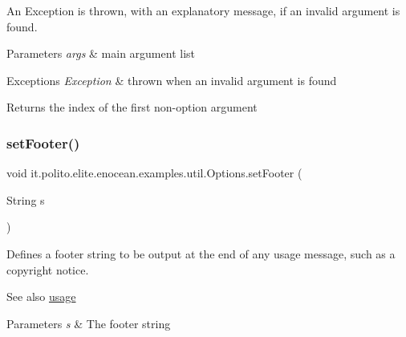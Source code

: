 An Exception is thrown, with an explanatory message, if an invalid argument is found. 
\begin{DoxyParams}{Parameters}
{\em args} & main argument list \\
\hline
\end{DoxyParams}

\begin{DoxyExceptions}{Exceptions}
{\em Exception} & thrown when an invalid argument is found \\
\hline
\end{DoxyExceptions}
\begin{DoxyReturn}{Returns}
the index of the first non-\/option argument 
\end{DoxyReturn}
\hypertarget{classit_1_1polito_1_1elite_1_1enocean_1_1examples_1_1util_1_1_options_a9b1cfe704a99879244c220539a1da10a}{}\label{classit_1_1polito_1_1elite_1_1enocean_1_1examples_1_1util_1_1_options_a9b1cfe704a99879244c220539a1da10a} 
\subsubsection{\texorpdfstring{set\+Footer()}{setFooter()}}
{\footnotesize\ttfamily void it.\+polito.\+elite.\+enocean.\+examples.\+util.\+Options.\+set\+Footer (\begin{DoxyParamCaption}\item[{String}]{s }\end{DoxyParamCaption})}

Defines a footer string to be output at the end of any usage message, such as a copyright notice.

\begin{DoxySeeAlso}{See also}
\hyperlink{classit_1_1polito_1_1elite_1_1enocean_1_1examples_1_1util_1_1_options_a2147573c225eeaac81cef1f12b6f3235}{usage} 
\end{DoxySeeAlso}

\begin{DoxyParams}{Parameters}
{\em s} & The footer string \\
\hline
\end{DoxyParams}
\hypertarget{classit_1_1polito_1_1elite_1_1enocean_1_1examples_1_1util_1_1_options_a9e2db7144be1ca4a580754204a416b52}{}\label{classit_1_1polito_1_1elite_1_1enocean_1_1examples_1_1util_1_1_options_a9e2db7144be1ca4a580754204a416b52} 
